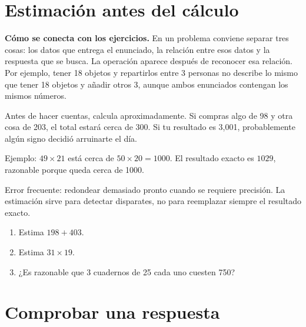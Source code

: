 \documentclass[10pt,oneside,openany]{book}
\begin{document}
\section{Estimación antes del cálculo}

\textbf{Cómo se conecta con los ejercicios.} En un problema conviene separar tres cosas: los datos que entrega el enunciado, la relación entre esos datos y la respuesta que se busca. La operación aparece después de reconocer esa relación. Por ejemplo, tener 18 objetos y repartirlos entre 3 personas no describe lo mismo que tener 18 objetos y añadir otros 3, aunque ambos enunciados contengan los mismos números.

Antes de hacer cuentas, calcula aproximadamente. Si compras algo de \textdollar{}98 y otra cosa de \textdollar{}203, el total estará cerca de \textdollar{}300. Si tu resultado es \textdollar{}3,001, probablemente algún signo decidió arruinarte el día.

\begin{ejemplo}
Ejemplo: $49\times21$ está cerca de $50\times20=1000$. El resultado exacto es $1029$, razonable porque queda cerca de 1000.
\end{ejemplo}

\begin{ojo}
Error frecuente: redondear demasiado pronto cuando se requiere precisión. La estimación sirve para detectar disparates, no para reemplazar siempre el resultado exacto.
\end{ojo}

\begin{practica}

\begin{enumerate}

\item Estima $198+403$.

\item Estima $31\times19$.

\item ¿Es razonable que 3 cuadernos de \textdollar{}25 cada uno cuesten \textdollar{}750?

\end{enumerate}

\end{practica}



\section{Comprobar una respuesta}
\end{document}
